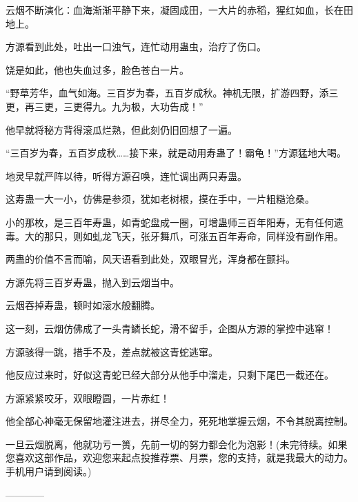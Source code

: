\begin{this_body}
云烟不断演化：血海渐渐平静下来，凝固成田，一大片的赤稻，猩红如血，长在田地上。

方源看到此处，吐出一口浊气，连忙动用蛊虫，治疗了伤口。

饶是如此，他也失血过多，脸色苍白一片。

“野草芳华，血气如海。三百岁为春，五百岁成秋。神机无限，扩游四野，添三更，再三更，三更得九。九为极，大功告成！”

他早就将秘方背得滚瓜烂熟，但此刻仍旧回想了一遍。

“三百岁为春，五百岁成秋……接下来，就是动用寿蛊了！霸龟！”方源猛地大喝。

地灵早就严阵以待，听得方源召唤，连忙调出两只寿蛊。

这寿蛊一大一小，仿佛是参须，犹如老树根，摸在手中，一片粗糙沧桑。

小的那枚，是三百年寿蛊，如青蛇盘成一圈，可增蛊师三百年阳寿，无有任何遗毒。大的那只，则如虬龙飞天，张牙舞爪，可涨五百年寿命，同样没有副作用。

两蛊的价值不言而喻，风天语看到此处，双眼冒光，浑身都在颤抖。

方源先将三百岁寿蛊，抛入到云烟当中。

云烟吞掉寿蛊，顿时如滚水般翻腾。

这一刻，云烟仿佛成了一头青鳞长蛇，滑不留手，企图从方源的掌控中逃窜！

方源骇得一跳，措手不及，差点就被这青蛇逃窜。

他反应过来时，好似这青蛇已经大部分从他手中溜走，只剩下尾巴一截还在。

方源紧紧咬牙，双眼瞪圆，一片赤红！

他全部心神毫无保留地灌注进去，拼尽全力，死死地掌握云烟，不令其脱离控制。

一旦云烟脱离，他就功亏一篑，先前一切的努力都会化为泡影！(未完待续。如果您喜欢这部作品，欢迎您来起点投推荐票、月票，您的支持，就是我最大的动力。手机用户请到阅读。)

------------

\end{this_body}


